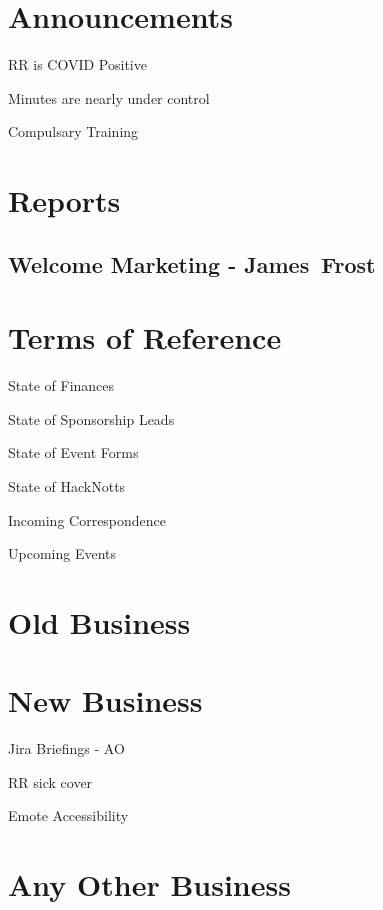 \documentclass[11pt,hacksoc,agenda]{meetingmins}
\begin{document}
\maketitle

\section{Announcements}
\begin{items}
\item RR is COVID Positive
\item Minutes are nearly under control
\item Compulsary Training
\end{items}

\section{Reports}
\subsection{Welcome Marketing - James~Frost}
\begin{hiddensubitems}
\item
\end{hiddensubitems}

\section{Terms of Reference}
\begin{items}
\item {State of Finances}
\item {State of Sponsorship Leads}
\item {State of Event Forms}
\item {State of HackNotts}
\item {Incoming Correspondence}
\item {Upcoming Events}
\end{items}

\section{Old Business}

\section{New Business}
\begin{items}
\item Jira Briefings - AO
\item RR sick cover
\item Emote Accessibility
\item 
\end{items}

\section{Any Other Business}

\vspace{1em}
\end{document}
